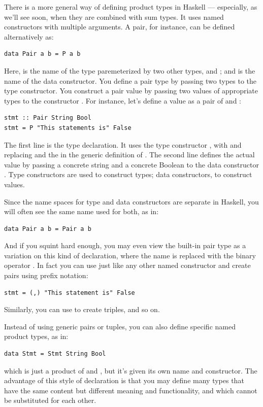 There is a more general way of defining product types in Haskell ---
especially, as we'll see soon, when they are combined with sum types. It
uses named constructors with multiple arguments. A pair, for instance,
can be defined alternatively as:

\begin{Verbatim}
data Pair a b = P a b
\end{Verbatim}
Here,  is the name of the type paremeterized by two
other types,  and ; and  is the name of
the data constructor. You define a pair type by passing two types to the
 type constructor. You construct a pair value by passing
two values of appropriate types to the constructor . For
instance, let's define a value  as a pair of
 and :

\begin{Verbatim}
stmt :: Pair String Bool
stmt = P "This statements is" False
\end{Verbatim}
The first line is the type declaration. It uses the type constructor
, with  and  replacing
 and the  in the generic definition of
. The second line defines the actual value by passing a
concrete string and a concrete Boolean to the data constructor
. Type constructors are used to construct types; data
constructors, to construct values.

Since the name spaces for type and data constructors are separate in
Haskell, you will often see the same name used for both, as in:

\begin{Verbatim}
data Pair a b = Pair a b
\end{Verbatim}
And if you squint hard enough, you may even view the built-in pair type
as a variation on this kind of declaration, where the name 
is replaced with the binary operator \code{(,)}. In fact you can use
\code{(,)} just like any other named constructor and create pairs
using prefix notation:

\begin{Verbatim}
stmt = (,) "This statement is" False
\end{Verbatim}
Similarly, you can use \code{(,,)} to create triples, and so on.

Instead of using generic pairs or tuples, you can also define specific
named product types, as in:

\begin{Verbatim}
data Stmt = Stmt String Bool
\end{Verbatim}
which is just a product of  and , but it's
given its own name and constructor. The advantage of this style of
declaration is that you may define many types that have the same content
but different meaning and functionality, and which cannot be substituted
for each other.

